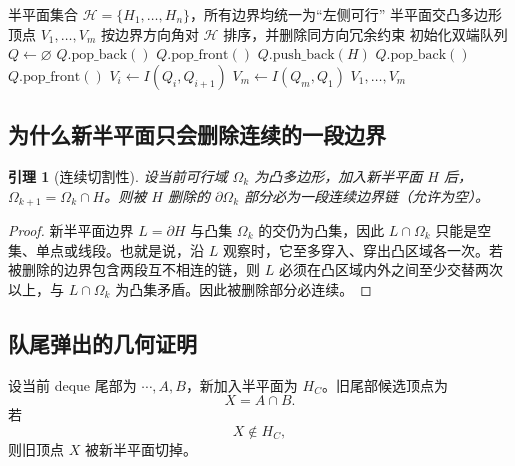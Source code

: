 \documentclass[UTF8,12pt,a4paper]{ctexart}
\newtheorem{lemma}[theorem]{引理}
\theoremstyle{definition}
\begin{document}
\begin{algorithm}[htbp]
\caption{双端队列半平面交（HPI）}
\label{alg:hpi}
\begin{algorithmic}[1]
\Require 半平面集合 $\mathcal H=\{H_1,\ldots,H_n\}$，所有边界均统一为“左侧可行”
\Ensure 半平面交凸多边形顶点 $V_1,\ldots,V_m$
\State 按边界方向角对 $\mathcal H$ 排序，并删除同方向冗余约束
\State 初始化双端队列 $Q\gets\varnothing$
        \State $Q.\mathrm{pop\_back}()$
    \EndWhile
        \State $Q.\mathrm{pop\_front}()$
    \EndWhile
    \State $Q.\mathrm{push\_back}(H)$
\EndFor
{}
    \State $Q.\mathrm{pop\_back}()$
\EndWhile
{}
    \State $Q.\mathrm{pop\_front}()$
\EndWhile
{}
    \State $V_i\gets I(Q_i,Q_{i+1})$
\EndFor
\State $V_m\gets I(Q_m,Q_1)$
\State \Return $V_1,\ldots,V_m$
\end{algorithmic}
\end{algorithm}

\subsection{为什么新半平面只会删除连续的一段边界}

\begin{lemma}[连续切割性]
设当前可行域 $\Omega_k$ 为凸多边形，加入新半平面 $H$ 后，$\Omega_{k+1}=\Omega_k\cap H$。则被 $H$ 删除的 $\partial\Omega_k$ 部分必为一段连续边界链（允许为空）。
\label{lem:continuous-cut}
\end{lemma}
\begin{proof}
新半平面边界 $L=\partial H$ 与凸集 $\Omega_k$ 的交仍为凸集，因此 $L\cap\Omega_k$ 只能是空集、单点或线段。也就是说，沿 $L$ 观察时，它至多穿入、穿出凸区域各一次。若被删除的边界包含两段互不相连的链，则 $L$ 必须在凸区域内外之间至少交替两次以上，与 $L\cap\Omega_k$ 为凸集矛盾。因此被删除部分必连续。
\end{proof}

\subsection{队尾弹出的几何证明}

设当前 deque 尾部为 $\cdots,A,B$，新加入半平面为 $H_C$。旧尾部候选顶点为
\begin{equation}
X=A\cap B.
\end{equation}
若
\begin{equation}
X\notin H_C,
\label{eq:tail-outside}
\end{equation}
则旧顶点 $X$ 被新半平面切掉。
\end{document}
